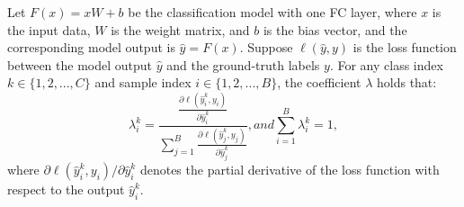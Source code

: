 \begin{theorem}
\label{lambda}
    Let $F(x)=xW+b$ be the classification model with one FC layer, where $x$ is the input data, $W$ is the weight matrix, and $b$ is the bias vector, and the corresponding model output is $\hat{y}=F(x)$. Suppose $\ell(\hat{y}, y)$ is the loss function between the model output $\hat{y}$ and the ground-truth labels $y$. For any class index $k\in\{1, 2, ..., C\}$ and sample index $i\in\{1, 2, ..., B\}$, the coefficient $\lambda$ holds that:
    \begin{equation}
    \lambda_i^k=\frac{\frac{\partial \ell(\hat{y}_i^k,y_i)}{\partial\hat{y}_i^k}}{\sum_{j=1}^B\frac{\partial \ell(\hat{y}_j^k,y_j)}{\partial\hat{y}_j^k}}, and \sum_{i=1}^B\lambda_i^k=1,
    \end{equation}
    where ${\partial \ell(\hat{y}_i^k,y_i)}/{\partial\hat{y}_i^k}$ denotes the partial derivative of the loss function with respect to the output $\hat{y}_i^k$.
\end{theorem}
